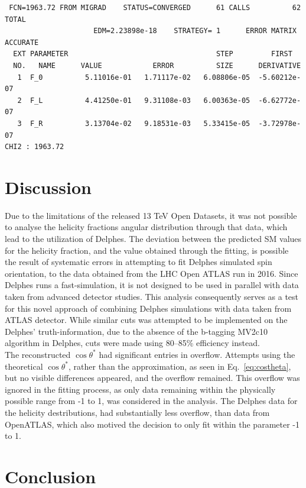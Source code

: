 \documentclass[12pt,a4paper]{article}
\numberwithin{equation}{section}
\begin{document}
\begin{verbatim}
 FCN=1963.72 FROM MIGRAD    STATUS=CONVERGED      61 CALLS          62 TOTAL
                     EDM=2.23898e-18    STRATEGY= 1      ERROR MATRIX ACCURATE
  EXT PARAMETER                                   STEP         FIRST
  NO.   NAME      VALUE            ERROR          SIZE      DERIVATIVE
   1  F_0          5.11016e-01   1.71117e-02   6.08806e-05  -5.60212e-07
   2  F_L          4.41250e-01   9.31108e-03   6.00363e-05  -6.62772e-07
   3  F_R          3.13704e-02   9.18531e-03   5.33415e-05  -3.72978e-07
CHI2 : 1963.72
\end{verbatim}


\section{Discussion}
Due to the limitations of the released 13 TeV Open Datasets, it was not possible
to analyse the helicity fractions angular distribution through that data, which
lead to the utilization of Delphes. The deviation between the predicted SM
values for the helicity fraction, and the value obtained through the fitting, is
possible the result of systematic errors in attempting to fit Delphes simulated
spin orientation, to the data obtained from the LHC Open ATLAS run in 2016.
Since Delphes runs a fast-simulation, it is not designed to be used in parallel
with data taken from advanced detector studies. This analysis consequently
serves as a test for this novel approach of combining Delphes simulations with
data taken from ATLAS detector. While similar cuts was attempted to be
implemented on the Delphes' truth-information, due to the absence of the
b-tagging MV2c10 algorithm in Delphes, cuts were made using 80--85\% efficiency
instead.\\ %

The reconstructed $\cos \theta^*$ had significant entries in overflow. Attempts using
the theoretical $\cos \theta^*$, rather than the approximation, as seen in
Eq.~\ref{eq:costheta}, but no visible differences appeared, and the overflow
remained. This overflow was ignored in the fitting process, as only data
remaining within the physically possible range from -1 to 1, was considered in
the analysis. The Delphes data for the helicity destributions, had substantially
less overflow, than data from OpenATLAS, which also motived the decision to only
fit within the parameter -1 to 1.

\section{Conclusion}

\printbibliography
\end{document}

